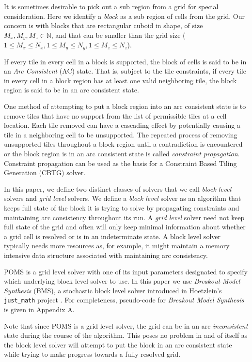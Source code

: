 It is sometimes desirable to pick out a sub region from a grid for special consideration.
Here we identify a \textit{block} as a sub region of cells from the grid.
Our concern is with blocks that are rectangular cuboid in shape,
of size $M_x, M_y, M_z \in \mathbb{N}$,
and that can be smaller than the grid size ($1 \le M_x \le N_x, 1 \le M_y \le N_y, 1 \le M_z \le N_z$).

If every tile in every cell in a block is supported, the block of cells is said to be in an \textit{Arc Consistent} (AC) state.
That is, subject to the tile constraints, if every tile in every cell in a block region has at least one valid neighboring tile, the block region
is said to be in an arc consistent state.

One method of attempting to put a block region into an arc consistent state is to remove tiles that have no support from the list of permissible
tiles at a cell location.
Each tile removed can have a cascading effect by potentially causing a tile in a neighboring cell to be unsupported.
The repeated process of removing unsupported tiles throughout a block region until a contradiction is encountered or the block region
is in an arc consistent state is called \textit{constraint propagation}.
Constraint propagation
can be used as the basis for a Constraint Based Tiling Generation (CBTG) solver.

In this paper, we define two distinct classes of solvers that we call \textit{block level} solvers and \textit{grid level} solvers.
We define a \textit{block level} solver as an algorithm that
keeps full state of the block it is trying to solve by propagating constraints and maintaining arc consistency
throughout its run.
A \textit{grid level} solver need not keep full state of the grid and often will only keep minimal information about whether
a grid cell is resolved or is in an indeterminate state.
A block level solver typically needs more resources as, for example,
it might maintain a memory intensive data structure associated
with maintaining arc consistency.

POMS is a grid level solver with one of its input parameters designated to specify
which underlying block level solver to use.
In this paper we use \textit{Breakout Model Synthesis} (BMS), a stochastic block level solver
introduced in Hoetzlein's \texttt{just\_math} project  \cite{Hoetzlein_2023}.
For completeness, pseudo-code for \textit{Breakout Model Synthesis} is given in Appendix A.

Note that since  POMS is a grid level solver, the grid can be in an arc \textit{inconsistent}
state during the course of the algorithm.
This poses no problem in and of itself as the block level solver will attempt to put the block
in an arc consistent state while trying to make progress towards a fully resolved
grid.




